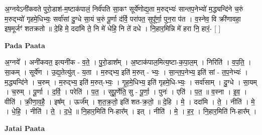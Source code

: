 \documentclass[17pt]{extarticle}
\begin{document}
अ॒ग्नयेऽनी॑कवते पुरो॒डाश॑-म॒ष्टाक॑पालं॒ निर्व॑पति सा॒कꣳ सूर्ये॑णोद्य॒ता म॒रुद्भ्यः॑ सान्तप॒नेभ्यो॑ म॒द्ध्यन्दि॑ने च॒रुं म॒रुद्भ्यो॑ गृहमे॒धिभ्यः॒ सर्वा॑सां दु॒ग्धे सा॒यं च॒रुं पू॒र्णा द॑र्वि॒ परा॑पत॒ सुपू᳚र्णा॒ पुन॒रा प॑त । व॒स्नेव॒ वि क्री॑णावहा॒ इष॒मूर्जꣳ॑ शतक्रतो ॥ दे॒हि मे॒ ददा॑मि ते॒ नि मे॑ धेहि॒ नि ते॑ दधे । नि॒हार॒मिन्नि मे॑ हरा नि॒ हारं॒- [ ] \newline

\textbf{Pada Paata} \newline

अ॒ग्नये᳚ । अनी॑कवत॒ इत्यनी॑क - व॒ते॒ । पु॒रो॒डाश᳚म् । अ॒ष्टाक॑पाल॒मित्य॒ष्टा-क॒पा॒ल॒म् । निरिति॑ । व॒प॒ति॒ । सा॒कम् । सूर्ये॑ण । उ॒द्य॒तेत्यु॑त् - य॒ता । म॒रुद्भ्य॒ इति॑ म॒रुत् - भ्यः॒ । सा॒न्त॒प॒नेभ्य॒ इति॑ सां - त॒प॒नेभ्यः॑ । म॒द्ध्यन्दि॑ने । च॒रुम् । म॒रुद्भ्य॒ इति॑ म॒रुत्-भ्यः॒ । गृ॒ह॒मे॒धिभ्य॒ इति॑ गृहमे॒धि-भ्यः॒ । सर्वा॑साम् । दु॒ग्धे । सा॒यम् । च॒रुम् । पू॒र्णा । द॒र्वि॒ । परेति॑ । प॒त॒ । सुपू॒र्णेति॒ सु - पू॒र्णा॒ । पुनः॑ । एति॑ । प॒त॒ ॥ व॒स्ना । इ॒व॒ । वीति॑ । क्री॒णा॒व॒है॒ । इष᳚म् । ऊर्ज᳚म् । श॒त॒क्र॒तो॒ इति॑ शत-क्र॒तो॒ ॥ दे॒हि । मे॒ । ददा॑मि । ते॒ । नीति॑ । मे॒ । धे॒हि॒ । नीति॑ । ते॒ । द॒धे॒ ॥ नि॒हार॒मिति॑ नि-हार᳚म् । इत् । नीति॑ । मे॒ । ह॒र॒ । नि॒हार॒मिति॑ नि-हार᳚म् ।  \newline



\textbf{Jatai Paata} \newline
\end{document}
